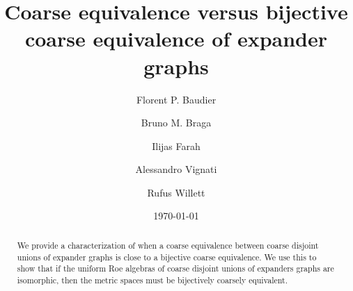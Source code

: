 \documentclass[11pt]{amsart}
\newcommand{\Manoa}{M\=anoa}
\newcommand{\Hawaii}{Hawai\kern.05em`\kern.05em\relax i}
\numberwithin{equation}{section}
\theoremstyle{definition}
\theoremstyle{remark}
\numberwithin{equation}{section}
\begin{document}
 
\title[Coarse equivalence versus bijective coarse equivalence]{Coarse equivalence versus bijective coarse equivalence of expander graphs}%

\date{\today} %

\author[Baudier]{Florent P. Baudier}
\address[F. P. Baudier]{Texas A\&M University, Department of Mathematics, College Station, TX 77843-3368, USA} 

\author[Braga]{Bruno M. Braga}
\address[B. M. Braga]{IMPA, Estrada Dona Castorina 110, 22460-320, Rio de Janeiro, Brazi}
 
\author[Farah]{Ilijas Farah}

\address[I. Farah]{Department of Mathematics and Statistics\\
York University\\
4700 Keele Street\\
North York, Ontario\\ Canada, M3J 1P3\\
and 
Matemati\v cki Institut SANU\\
Kneza Mihaila 36\\
11\,000 Beograd, p.p. 367\\
Serbia}

\author[Vignati]{Alessandro Vignati}
\address[A. Vignati]{
Institut de Math\'ematiques de Jussieu (IMJ-PRG)\\
Universit\'e Paris Cit\'e\\
B\^atiment Sophie Germain\\
8 Place Aur\'elie Nemours \\ 75013 Paris, France}

\author[Willett]{Rufus Willett}
\address[R. Willett]{University of \Hawaii~at \Manoa, 2565 McCarthy Mall, Keller 401A, Honolulu, HI 96816, USA} 
 
\maketitle

\begin{abstract}
We provide a characterization of when a coarse equivalence between  coarse disjoint unions of expander graphs is close to a bijective coarse equivalence. We use this to show that  if the uniform Roe algebras of coarse disjoint unions of expanders graphs are isomorphic, then the metric spaces must be bijectively coarsely equivalent.     
\end{abstract}  
\end{document}
